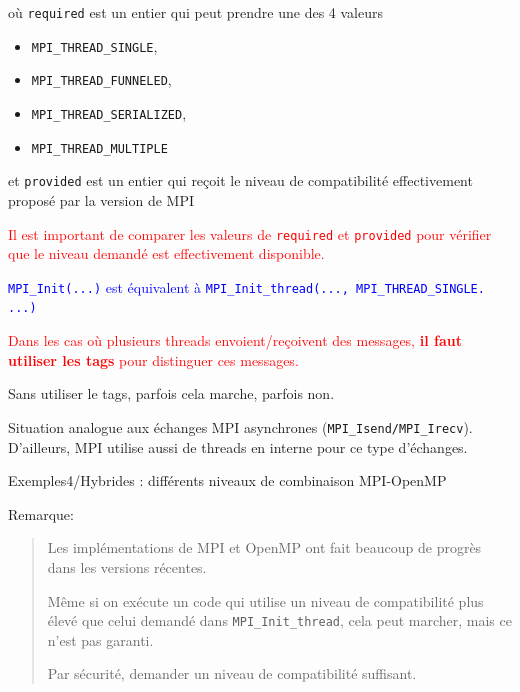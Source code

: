\documentclass{beamer}
\begin{document}
\begin{frame}[fragile]
	où {\tt required} est un entier qui peut prendre une des 4 valeurs \begin{itemize}
		\item {\tt MPI\_THREAD\_SINGLE},
		\item {\tt MPI\_THREAD\_FUNNELED},
		\item {\tt MPI\_THREAD\_SERIALIZED},
		\item {\tt MPI\_THREAD\_MULTIPLE}
	\end{itemize}   
	\vfill
	
	et {\tt provided} est un entier qui reçoit le niveau de compatibilité effectivement proposé par la version de MPI
	
	\vfill
	\textcolor{red}{Il est important de comparer les valeurs de {\tt required} et {\tt provided} pour vérifier que le niveau demandé est effectivement disponible.} 
	
	\vfill
	\textcolor{blue}{{\tt MPI\_Init(...)} est équivalent à {\tt MPI\_Init\_thread(..., MPI\_THREAD\_SINGLE. ...)}}
\end{frame}

\begin{frame}
	\vfill
	\textcolor{red}{Dans les cas où plusieurs threads envoient/reçoivent des messages, \textbf{il faut utiliser les tags} pour distinguer ces messages.}
	\bigskip
	
	Sans utiliser le tags, parfois cela marche, parfois non.
	
	\medskip
	Situation analogue aux échanges MPI asynchrones (\texttt{MPI\_Isend/MPI\_Irecv}). D'ailleurs, MPI utilise aussi de threads en interne pour ce type d'échanges.
	\vfill
\end{frame}

\begin{frame}
	Exemples4/Hybrides : différents niveaux de combinaison MPI-OpenMP
	
	\vfill
	
	Remarque:
	\begin{quote}
		Les implémentations de MPI et OpenMP ont fait beaucoup de progrès dans les versions récentes.
		
	\bigskip
		Même si on exécute un code qui utilise un niveau de compatibilité plus élevé que celui demandé dans {\tt MPI\_Init\_thread}, cela peut marcher, mais ce n'est pas garanti.
		
	\bigskip
		Par sécurité, demander un niveau de compatibilité suffisant.
	\end{quote}

	\vfill
	
\end{frame}
\end{document}
